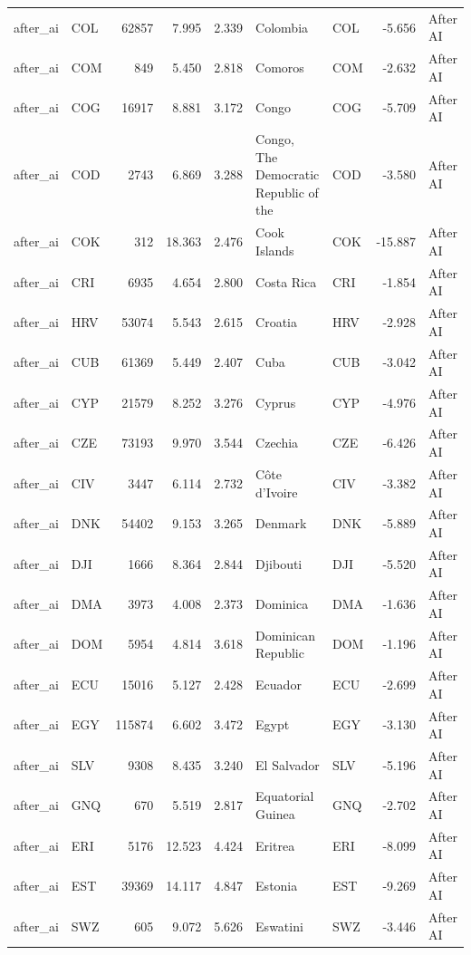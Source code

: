 \begin{tabular}{llrrrllrl}
after\_ai & COL & 62857 & 7.995 & 2.339 & Colombia & COL & -5.656 & After AI \\
after\_ai & COM & 849 & 5.450 & 2.818 & Comoros & COM & -2.632 & After AI \\
after\_ai & COG & 16917 & 8.881 & 3.172 & Congo & COG & -5.709 & After AI \\
after\_ai & COD & 2743 & 6.869 & 3.288 & Congo, The Democratic Republic of the & COD & -3.580 & After AI \\
after\_ai & COK & 312 & 18.363 & 2.476 & Cook Islands & COK & -15.887 & After AI \\
after\_ai & CRI & 6935 & 4.654 & 2.800 & Costa Rica & CRI & -1.854 & After AI \\
after\_ai & HRV & 53074 & 5.543 & 2.615 & Croatia & HRV & -2.928 & After AI \\
after\_ai & CUB & 61369 & 5.449 & 2.407 & Cuba & CUB & -3.042 & After AI \\
after\_ai & CYP & 21579 & 8.252 & 3.276 & Cyprus & CYP & -4.976 & After AI \\
after\_ai & CZE & 73193 & 9.970 & 3.544 & Czechia & CZE & -6.426 & After AI \\
after\_ai & CIV & 3447 & 6.114 & 2.732 & Côte d'Ivoire & CIV & -3.382 & After AI \\
after\_ai & DNK & 54402 & 9.153 & 3.265 & Denmark & DNK & -5.889 & After AI \\
after\_ai & DJI & 1666 & 8.364 & 2.844 & Djibouti & DJI & -5.520 & After AI \\
after\_ai & DMA & 3973 & 4.008 & 2.373 & Dominica & DMA & -1.636 & After AI \\
after\_ai & DOM & 5954 & 4.814 & 3.618 & Dominican Republic & DOM & -1.196 & After AI \\
after\_ai & ECU & 15016 & 5.127 & 2.428 & Ecuador & ECU & -2.699 & After AI \\
after\_ai & EGY & 115874 & 6.602 & 3.472 & Egypt & EGY & -3.130 & After AI \\
after\_ai & SLV & 9308 & 8.435 & 3.240 & El Salvador & SLV & -5.196 & After AI \\
after\_ai & GNQ & 670 & 5.519 & 2.817 & Equatorial Guinea & GNQ & -2.702 & After AI \\
after\_ai & ERI & 5176 & 12.523 & 4.424 & Eritrea & ERI & -8.099 & After AI \\
after\_ai & EST & 39369 & 14.117 & 4.847 & Estonia & EST & -9.269 & After AI \\
after\_ai & SWZ & 605 & 9.072 & 5.626 & Eswatini & SWZ & -3.446 & After AI \\

\end{tabular}
